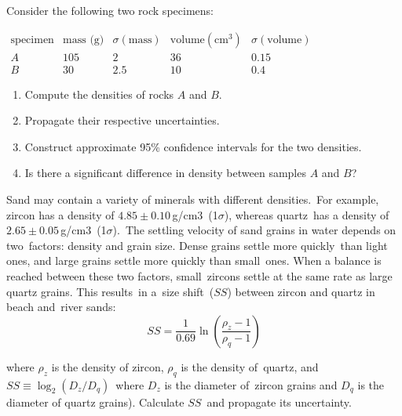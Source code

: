 \documentclass{article}
\begin{document}
\noindent\begin{minipage}{\linewidth}

Consider the following two rock specimens:\medskip

\(
\begin{array}{ccccc}
  \mbox{specimen} & \mbox{mass (g)} & \sigma(\mbox{mass}) &
  \mbox{volume}(\mbox{cm}^3) & \sigma(\mbox{volume}) \\ \hline
  A & 105 & 2 & 36 & 0.15\\ B & 30 & 2.5 & 10 & 0.4
\end{array}
\)

\begin{enumerate}
\item Compute the densities of rocks \(A\) and \(B\).
\item Propagate their respective uncertainties.
\item Construct approximate 95\% confidence intervals for the two densities.
\item Is there a significant difference in density between samples \(A\) and \(B\)?
\end{enumerate}

\end{minipage}

\vspace{1cm}

\noindent\begin{minipage}{.55\linewidth}

Sand may contain a variety of minerals with different densities. For
example, zircon has a density of \(4.85\pm0.10\)\,g/cm3 (1\(\sigma\)),
whereas quartz has a density of
\(2.65\pm0.05\)\,g/cm3 (1\(\sigma\)). The settling velocity of sand
grains in water depends on two factors: density and grain size. Dense
grains settle more quickly than light ones, and large grains settle
more quickly than small ones. When a balance is reached between these
two factors, small zircons settle at the same rate as large quartz
grains. This results in a size shift (\(SS\)) between zircon and
quartz in beach and river sands:
\begin{equation*}
SS = \frac{1}{0.69}\ln\left(\frac{\rho_z-1}{\rho_q-1}\right)
\end{equation*}

where \(\rho_z\) is the density of zircon, \(\rho_q\) is the density
of quartz, and \(SS \equiv \log_2(D_z/D_q)\) where \(D_z\) is the
diameter of zircon grains and \(D_q\) is the diameter of quartz
grains). Calculate \(SS\) and propagate its uncertainty.

\end{minipage}
\end{document}
